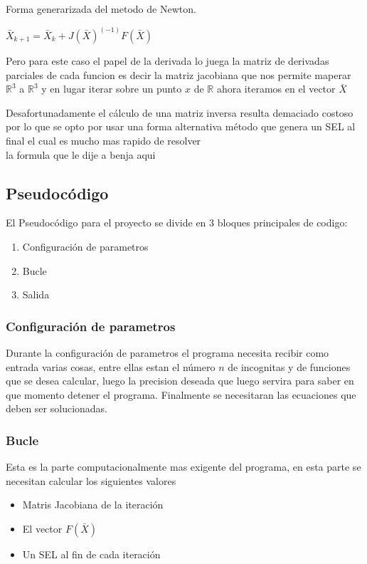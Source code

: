 \documentclass[11pt]{article}
\begin{document}
Forma generarizada del metodo de Newton.
 
\begin{center}
$\bar{X}_{k+1} = \bar{X}_{k} + J(\bar{X})^(-1)F(\bar{X})  \label{eq:2}$
\end{center}

Pero para este caso el papel de la derivada lo juega la matriz de derivadas parciales de cada funcion es decir la matriz jacobiana que nos permite maperar  $\mathbb{R}^3$ a $\mathbb{R}^3$ y en lugar iterar sobre un punto $x$ de $\mathbb{R}$  ahora iteramos en el vector $\bar{X}$

Desafortunadamente el cálculo de una matriz inversa resulta demaciado costoso por lo que se opto por usar una forma alternativa método que genera un SEL al final el cual es mucho mas rapido de resolver\\

{la formula que le dije a benja aqui }

\subsection{Pseudocódigo}
El Pseudocódigo para el proyecto se divide en 3 bloques principales de codigo:
\begin{enumerate}
  \item Configuración de parametros
  \item Bucle
  \item Salida
\end{enumerate}

\subsubsection{Configuración de parametros}
Durante la configuración de parametros el programa necesita recibir como entrada varias cosas, entre ellas estan el número  $n$ de incognitas y de funciones que se desea calcular, luego la precision deseada que luego servira para saber en que momento detener el programa. Finalmente se necesitaran las ecuaciones que deben ser solucionadas.

\subsubsection{Bucle}
Esta es la parte computacionalmente mas exigente del programa, en esta parte se necesitan calcular los siguientes valores
\begin{itemize}
  \item Matris Jacobiana de la iteración
  \item El vector $F(\bar{X})$
  \item Un SEL al fin de cada iteración
\end{itemize}
\end{document}
